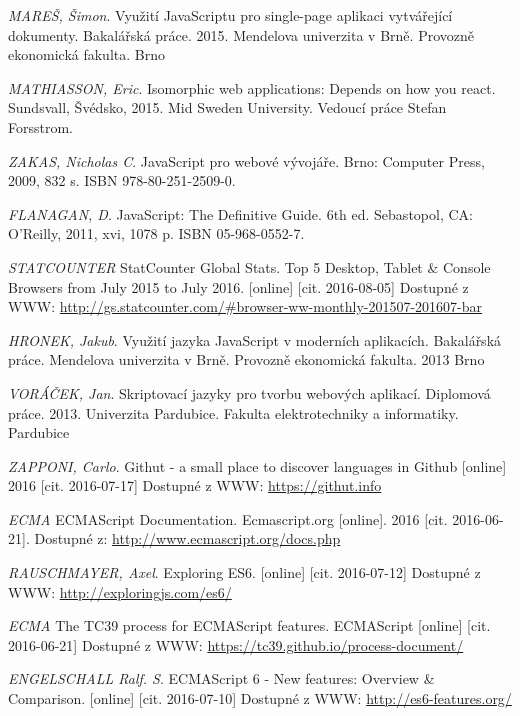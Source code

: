 \begin{thebibliography}{10}

 \textit{MAREŠ, Šimon}. Využití JavaScriptu pro single-page aplikaci vytvářející dokumenty. Bakalářská práce. 2015. Mendelova univerzita v Brně. Provozně ekonomická fakulta. Brno

 \textit{MATHIASSON, Eric}. Isomorphic web applications: Depends on how you react. Sundsvall, Švédsko, 2015. Mid Sweden University. Vedoucí práce Stefan Forsstrom.

 \textit{ZAKAS, Nicholas C}. JavaScript pro webové vývojáře. Brno: Computer Press, 2009, 832 s. ISBN 978-80-251-2509-0.

 \textit{FLANAGAN, D}. JavaScript: The Definitive Guide. 6th ed. Sebastopol, CA: O’Reilly, 2011, xvi, 1078 p. ISBN 05-968-0552-7.

 \textit{STATCOUNTER} StatCounter Global Stats. Top 5 Desktop, Tablet \& Console Browsers from July 2015 to July 2016. [online] [cit. 2016-08-05] Dostupné z WWW: \url{http://gs.statcounter.com/#browser-ww-monthly-201507-201607-bar}

 \textit{HRONEK, Jakub}. Využití jazyka JavaScript v moderních aplikacích. Bakalářská práce. Mendelova univerzita v Brně. Provozně ekonomická fakulta. 2013 Brno

 \textit{VORÁČEK, Jan}. Skriptovací jazyky pro tvorbu webových aplikací. Diplomová práce. 2013. Univerzita Pardubice. Fakulta elektrotechniky a informatiky. Pardubice

 \textit{ZAPPONI, Carlo}. Githut - a small place to discover languages in Github [online] 2016 [cit. 2016-07-17] Dostupné z WWW: \url{https://githut.info}

 \textit{ECMA} ECMAScript Documentation. Ecmascript.org [online]. 2016 [cit. 2016-06-21]. Dostupné z: \url{http://www.ecmascript.org/docs.php}

 \textit{RAUSCHMAYER, Axel}. Exploring ES6. [online] [cit. 2016-07-12] Dostupné z WWW: \url{http://exploringjs.com/es6/}

 \textit{ECMA} The TC39 process for ECMAScript features. ECMAScript [online] [cit. 2016-06-21] Dostupné z WWW: \url{https://tc39.github.io/process-document/}

 \textit{ENGELSCHALL Ralf. S}. ECMAScript 6 - New features: Overview \& Comparison. [online] [cit. 2016-07-10] Dostupné z WWW: \url{http://es6-features.org/}


\end{thebibliography}
